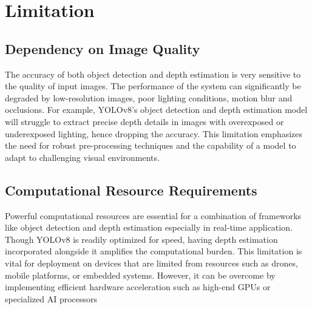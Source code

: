 \section{Limitation}

\subsection{Dependency on Image Quality}
The accuracy of both object detection and depth estimation is very sensitive to the quality of input images. The performance of the system can significantly be degraded by low-resolution images, poor lighting conditions, motion blur and occlusions. For example, YOLOv8’s object detection and depth estimation model will struggle to extract precise depth details in images with overexposed or underexposed lighting, hence dropping the accuracy. This limitation emphasizes the need for robust pre-processing techniques and the capability of a model to adapt to challenging visual environments.

\subsection{Computational Resource Requirements}
Powerful computational resources are essential for a combination of frameworks like object detection and depth estimation especially in real-time application. Though YOLOv8 is readily optimized for speed, having depth estimation incorporated alongside it amplifies the computational burden. This limitation is vital for deployment on devices that are limited from resources such as drones, mobile platforms, or embedded systems. However, it can be overcome by implementing efficient hardware acceleration such as high-end GPUs or specialized AI processors
